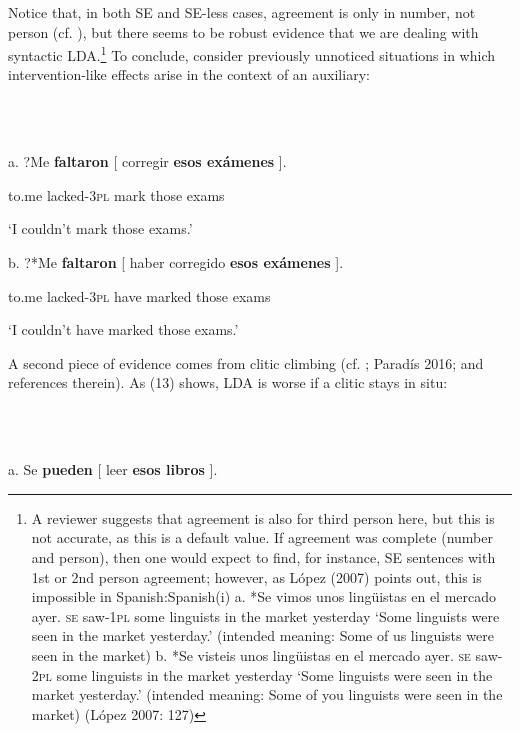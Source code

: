 \documentclass[output=paper]{langsci/langscibook}
\begin{document}
Notice that, in both SE and SE-less cases, agreement is only in number, not person (cf. \citealt{Etxepare2005}), but there seems to be robust evidence that we are dealing with syntactic LDA.\footnote{A reviewer suggests that agreement is also for third person here, but this is not accurate, as this is a default value. If agreement was complete (number and person), then one would expect to find, for instance, SE sentences with 1st or 2nd person agreement; however, as López (2007) points out, this is impossible in Spanish:Spanish(i)  a.  *Se  vimos      unos  lingüistas en  el   mercado ayer.            \textsc{se}     saw-\textsc{1pl}  some linguists   in  the market    yesterday    ‘Some linguists were seen in the market yesterday.’      (intended meaning: Some of us linguists were seen in the market)  b.  *Se  visteis      unos  lingüistas en  el    mercado  ayer.          \textsc{se}  saw-\textsc{2pl}  some linguists   in  the  market     yesterday          ‘Some linguists were seen in the market yesterday.’     (intended meaning: Some of you linguists were seen in the market)    (López 2007: 127)} To conclude, consider previously unnoticed situations in which intervention-like effects arise in the context of an auxiliary: 

\ea%
    \label{ex:key:12}
    \gll\\
        \\
    \glt
    \z

          a.  ?Me       \textbf{faltaron}      [ corregir \textbf{esos   exámenes} ].

          to.me   lacked-\textsc{3pl}   mark      those exams

          ‘I couldn’t mark those exams.’

  b.   ?*Me      \textbf{faltaron}   [ haber  corregido \textbf{esos    exámenes} ].

            to.me  lacked\textsc{{}-3pl}  have   marked     those  exams

         ‘I couldn’t have marked those exams.’

A second piece of evidence comes from clitic climbing (cf. \citealt{Gallego2016}; Paradís 2016; and references therein). As (13) shows, LDA is worse if a clitic stays in situ:

\ea%
    \label{ex:key:13}
    \gll\\
        \\
    \glt
    \z

             a.   Se  \textbf{pueden}  [ leer   \textbf{esos    libros} ].
\end{document}

